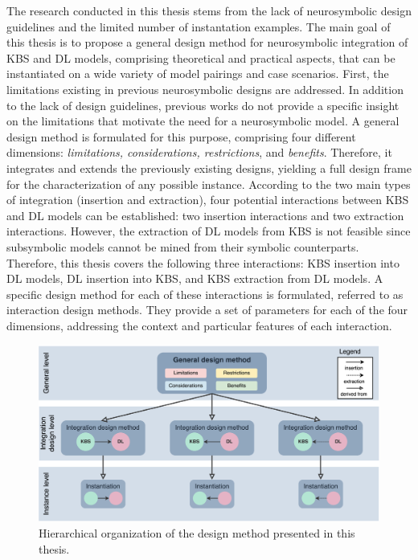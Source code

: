The research conducted in this thesis stems from the lack of neurosymbolic design guidelines and the limited number of instantation examples. The main goal of this thesis is to propose a general design method for neurosymbolic integration of KBS and DL models, comprising theoretical and practical aspects, that can be instantiated on a wide variety of model pairings and case scenarios. First, the limitations existing in previous neurosymbolic designs are addressed. In addition to the lack of design guidelines, previous works do not provide a specific insight on the limitations that motivate the need for a neurosymbolic model. A general design method is formulated for this purpose, comprising four different dimensions: \textit{limitations, considerations, restrictions}, and \textit{benefits}. Therefore, it integrates and extends the previously existing designs, yielding a full design frame for the characterization of any possible instance. According to the two main types of integration (insertion and extraction), four potential interactions between KBS and DL models can be established: two insertion interactions and two extraction interactions. However, the extraction of DL models from KBS is not feasible since subsymbolic models cannot be mined from their symbolic counterparts. Therefore, this thesis covers the following three interactions: KBS insertion into DL models, DL insertion into KBS, and KBS extraction from DL models. A specific design method for each of these interactions is formulated, referred to as interaction design methods. They provide a set of parameters for each of the four dimensions, addressing the context and particular features of each interaction. 

\begin{figure}
    \centering
    \includegraphics[width=\linewidth]{1_introduction/figures/hierarchy_method.eps}
    \caption{Hierarchical organization of the design method presented in this thesis.}
    \label{fig:hierarchy_design}
\end{figure}

